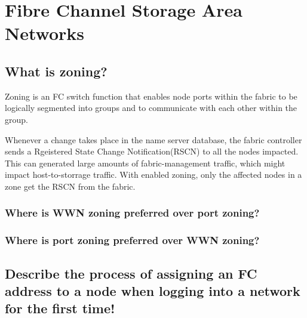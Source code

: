 \section{Fibre Channel Storage Area Networks} %
\label{sec:fibre_channel_storage_area_networks}

\subsection{What is zoning?} %
\label{sub:what_is_zoning}
	Zoning is an FC switch function
	that enables node ports within the fabric to be logically segmented
	into groups and to communicate with each other within the group.

	Whenever a change takes place in the name server database,
	the fabric controller sends a Rgeistered State Change Notification(RSCN)
	to all the nodes impacted.
	This can generated large amounts of fabric-management traffic,
	which might impact host-to-storrage traffic.
	With enabled zoning,
	only the affected nodes in a zone get the RSCN from the fabric.

\subsubsection{Where is WWN zoning preferred over port zoning?} %
\label{ssub:where_is_wwn_zoning_preferred_over_port_zoning}


\subsubsection{Where is port zoning preferred over WWN zoning?} %
\label{ssub:where_is_port_zoning_preferred_over_wwn_zoning}



\subsection{Describe the process of assigning an FC address to a node when logging into a network for the first time!} %
\label{sub:describe_the_process_of_assigning_an_fc_address_to_a_node_when_logging_into_a_network_for_the_first_time}


